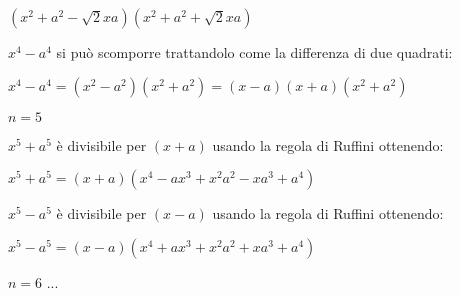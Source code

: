 \begin{itemize*}
\begin{itemize*}
   $\left(x^2+a^2-\sqrt{2}xa\right)\left(x^2+a^2+\sqrt{2}xa\right)$
   
  \item $x^4-a^4$ si può scomporre trattandolo come la differenza di due 
   quadrati:
   
   $x^4-a^4 = (x^2-a^2)(x^2+a^2) = (x-a)(x+a)(x^2+a^2) $
 \end{itemize*}

 \item $n=5$
 \begin{itemize*}
  \item $x^5+a^5$ è divisibile per $(x+a)$ usando la regola di Ruffini
   ottenendo: 
   
   $x^5+a^5=(x+a)(x^4-ax^3+x^2a^2-xa^3+a^4)$
   
  \item $x^5-a^5$ è divisibile per $(x-a)$ usando la regola di Ruffini
   ottenendo: 
   
   $x^5-a^5=(x-a)(x^4+ax^3+x^2a^2+xa^3+a^4)$
   
 \end{itemize*}

 \item $n=6$ ...
 
\end{itemize*}

%  
% 
% 
% 
%  
% 
% 
% 
% 
% 

